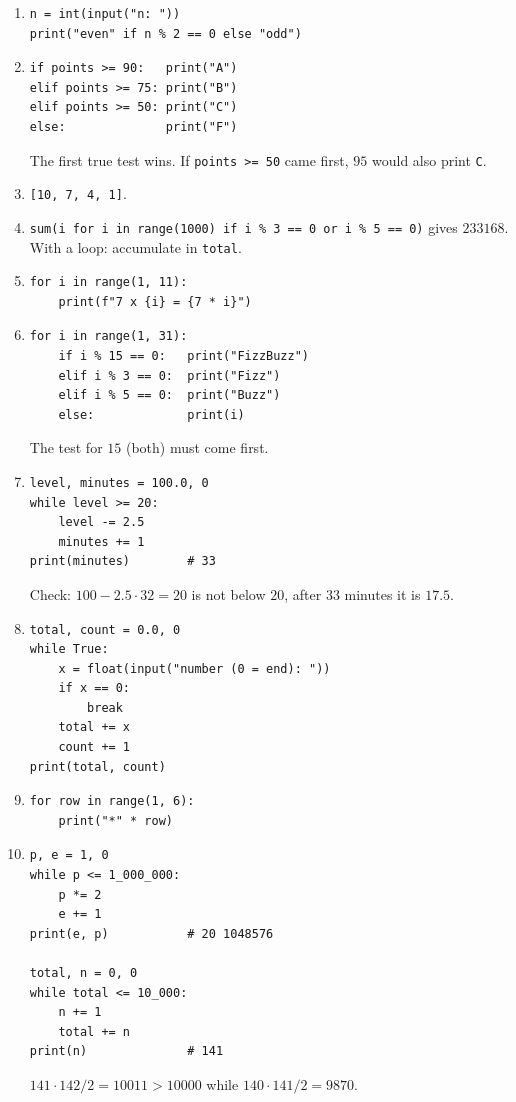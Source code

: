 \begin{enumerate}[label=\textbf{\ansnum.\arabic*}]
  \item
\begin{verbatim}
n = int(input("n: "))
print("even" if n % 2 == 0 else "odd")
\end{verbatim}
  \item
\begin{verbatim}
if points >= 90:   print("A")
elif points >= 75: print("B")
elif points >= 50: print("C")
else:              print("F")
\end{verbatim}
  The first true test wins. If \texttt{points >= 50} came first, $95$ would also print \texttt{C}.
  \item \texttt{[10, 7, 4, 1]}.
  \item \verb!sum(i for i in range(1000) if i % 3 == 0 or i % 5 == 0)! gives $233168$. With a loop: accumulate in \texttt{total}.
  \item
\begin{verbatim}
for i in range(1, 11):
    print(f"7 x {i} = {7 * i}")
\end{verbatim}
  \item
\begin{verbatim}
for i in range(1, 31):
    if i % 15 == 0:   print("FizzBuzz")
    elif i % 3 == 0:  print("Fizz")
    elif i % 5 == 0:  print("Buzz")
    else:             print(i)
\end{verbatim}
  The test for $15$ (both) must come first.
  \item
\begin{verbatim}
level, minutes = 100.0, 0
while level >= 20:
    level -= 2.5
    minutes += 1
print(minutes)        # 33
\end{verbatim}
  Check: $100-2.5\cdot32=20$ is not below $20$, after $33$ minutes it is $17.5$.
  \item
\begin{verbatim}
total, count = 0.0, 0
while True:
    x = float(input("number (0 = end): "))
    if x == 0:
        break
    total += x
    count += 1
print(total, count)
\end{verbatim}
  \item
\begin{verbatim}
for row in range(1, 6):
    print("*" * row)
\end{verbatim}
  \item[\textbf{\ansnum.10}]
\begin{verbatim}
p, e = 1, 0
while p <= 1_000_000:
    p *= 2
    e += 1
print(e, p)           # 20 1048576

total, n = 0, 0
while total <= 10_000:
    n += 1
    total += n
print(n)              # 141
\end{verbatim}
  $141\cdot142/2=10011>10000$ while $140\cdot141/2=9870$.
\end{enumerate}
